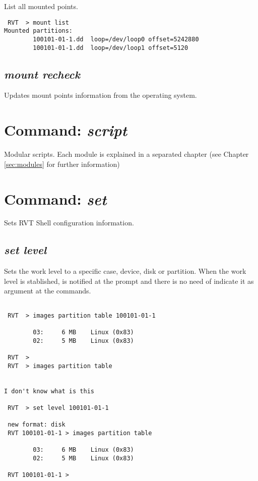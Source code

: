 \documentclass[a4paper,11pt,oneside]{report}
\begin{document}
List all mounted points.

\begin{verbatim}
 RVT  > mount list
Mounted partitions: 
        100101-01-1.dd  loop=/dev/loop0 offset=5242880
        100101-01-1.dd  loop=/dev/loop1 offset=5120
\end{verbatim}


\subsection*{\emph{mount recheck}}

Updates mount points information from the operating system.



\section{Command: \emph{script}}

Modular scripts. Each module is explained in a separated chapter (see Chapter \ref{sec:modules} for further information)


\section{Command: \emph{set}}

Sets RVT Shell configuration information.

\subsection*{\emph{set level}}

Sets the work level to a specific case, device, disk or partition. When the work level is stablished, is notified at the prompt and there is no need of indicate it as argument at the commands.

\begin{verbatim}

 RVT  > images partition table 100101-01-1                                    

        03:     6 MB    Linux (0x83)
        02:     5 MB    Linux (0x83)

 RVT  > 
 RVT  > images partition table


I don't know what is this

 RVT  > set level 100101-01-1                                                 

 new format: disk
 RVT 100101-01-1 > images partition table                                     

        03:     6 MB    Linux (0x83)
        02:     5 MB    Linux (0x83)

 RVT 100101-01-1 > 
\end{verbatim}
\end{document}

